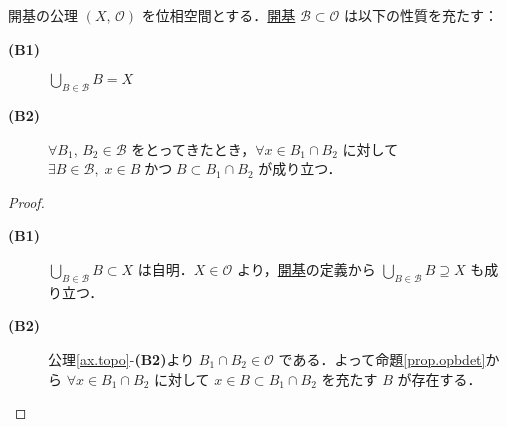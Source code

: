 \documentclass[geometry_main]{subfiles}
\begin{document}
\begin{mytheo}[label=ax.opbase]{開基の公理}
	$(X,\, \mathscr{O})$ を位相空間とする．\hyperref[def.opbase]{開基} $\mathscr{B} \subset \mathscr{O}$ は以下の性質を充たす：
	\begin{description}
		\item[\textbf{(B1)}] $\displaystyle \bigcup_{B \in \mathscr{B}} B = X$
		\item[\textbf{(B2)}] $\forall B_1,\, B_2 \in \mathscr{B}$ をとってきたとき，$\forall x \in B_1 \cap B_2$ に対して $\exists B \in \mathscr{B},\; x \in B\; \text{かつ} \; B \subset B_1 \cap B_2$ が成り立つ．  
	\end{description}
\end{mytheo}
\begin{proof}
	\begin{description}
		\item[\textbf{(B1)}] $\bigcup_{B \in \mathscr{B}} B \subset X$ は自明．$X \in \mathscr{O}$ より，\hyperref[def.opbase]{開基}の定義から $\bigcup_{B \in \mathscr{B}} B \supseteq X$ も成り立つ．
		\item[\textbf{(B2)}] 公理\ref{ax.topo}-\textsf{\textbf{(B2)}}より $B_1 \cap B_2 \in \mathscr{O}$ である．よって命題\ref{prop.opbdet}から $\forall x \in B_1 \cap B_2$ に対して $x \in B \subset B_1 \cap B_2$ を充たす $B$ が存在する．
	\end{description}
\end{proof}
\end{document}
